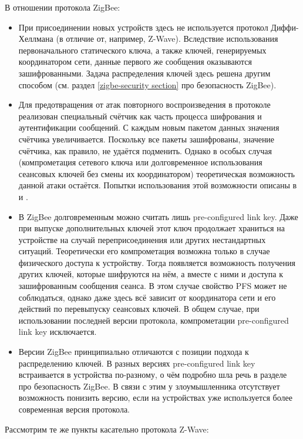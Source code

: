 	В отношении протокола ZigBee:
	
	\begin{itemize}
		\item При присоединении новых устройств здесь не используется протокол Диффи-Хеллмана
		(в отличие от, например, Z-Wave). Вследствие использования первоначального статического
		ключа, а также ключей, генерируемых координатором сети, данные первого же сообщения
		оказываются зашифрованными. Задача распределения ключей здесь решена другим способом
		(см. раздел \ref{zigbe-security section} про безопасность ZigBee).
		\item Для предотвращения от атак повторного воспроизведения в протоколе реализован
		специальный счётчик как часть процесса шифрования и аутентификации сообщений. С каждым
		новым пакетом данных значения счётчика увеличивается. Поскольку все пакеты зашифрованы,
		значение счётчика, как правило, не удаётся подменить. Однако в особых случая (компрометация
		сетевого ключа или долговременное использования сеансовых ключей без смены их координатором)
		теоретическая возможность данной атаки остаётся. Попытки использования этой возможности
		описаны в \cite{zigbee-attacks} и \cite{zigbee-security-analysis}.
		\item В ZigBee долговременным можно считать лишь pre-configured link key. Даже при выпуске 
		дополнительных ключей этот ключ продолжает храниться на устройстве на случай переприсоединения 
		или других нестандартных ситуаций. Теоретически его компрометация возможна только в случае
		физического доступа к устройству. Тогда появляется возможность получения других ключей,
		которые шифруются на нём, а вместе с ними и доступа к зашифрованным сообщения сеанса.
		В этом случае свойство PFS может не соблюдаться, однако даже здесь всё зависит от координатора
		сети и его действий по перевыпуску сеансовых ключей. В общем случае, при использовании последней
		версии протокола, компрометации pre-configured link key исключается.
		\item Версии ZigBee принципиально отличаются с позиции подхода к распределению ключей. В разных
		версиях pre-configured link key встраивается в устройства по-разному, о чём подробно шла речь
		в разделе про безопасность ZigBee. В связи с этим у злоумышленника отсутствует возможность
		понизить версию, если на устройствах уже используется более современная версия протокола.
	\end{itemize}

	Рассмотрим те же пункты касательно протокола Z-Wave:
	
